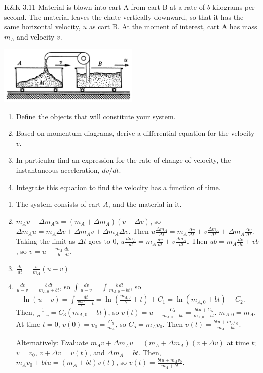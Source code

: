 \documentclass{esg8012pset}
\renewcommand{\d}{\,d}
\begin{document}
\begin{problem}{K\&K 3.11}
  Material is blown into cart A from cart B at a rate of $b$ kilograms per second. The material leaves the chute vertically downward, so that it has the same horizontal velocity, $u$ as cart B. At the moment of interest, cart A has mass $m_A$ and velocity $v$.
  \begin{center}\includegraphics[width=0.5\textwidth]{ps_04_2}\end{center}
  \begin{enumerate}
    \item Define the objects that will constitute your system.
    \item Based on momentum diagrams, derive a differential equation for the velocity $v$.
    \item In particular find an expression for the rate of change of velocity, the instantaneous acceleration, $d v / d t$.
    \item Integrate this equation to find the velocity has a function of time.
  \end{enumerate}
\end{problem}
\begin{solution}
  \begin{enumerate}
    \item The system consists of cart $A$, and the material in it.
    \item $m_A v + \Delta m_A u = (m_A + \Delta m_A) (v + \Delta v)$, so $\Delta m_A u = m_A \Delta v + \Delta m_A v + \Delta m_A \Delta v$.  Then $u \frac{\Delta m_A}{\Delta t} = m_A\frac{\Delta v}{\Delta t} + v\frac{\Delta m_A}{\Delta t} + \Delta m_A \frac{\Delta v}{\Delta t}$.  Taking the limit as $\Delta t$ goes to 0, $u\frac{\d m_A}{\d t} = m_A \frac{\d v}{\d t} + v\frac{\d m_A}{\d t}$.  Then $ub = m_A \frac{\d v}{\d t} + vb$, so $v = u - \frac{m_A}{b}\frac{\d v}{\d t}$.
    \item $\frac{\d v}{\d t} = \frac{b}{m_A}(u - v)$
    \item $\frac{\d v}{u - v} = \frac{b\d t}{m_{A, 0} + bt}$, so $\int \frac{\d v}{u - v} = \int \frac{b\d t}{m_{A, 0} + bt}$, so $-\ln(u - v) = \int\frac{\d t}{\frac{m_{A,0}}{b} + t} = \ln\left(\frac{m_{A,0}}{b} + t\right) + C_1 = \ln(m_{A,0} + b t) + C_2$.  Then, $\frac{1}{u - v} = C_3 (m_{A,0} + bt)$, so $v(t) = u - \frac{C_4}{m_{A,0} + bt} = \frac{b t u + C_5}{m_{A, 0} + b t}$.  $m_{A, 0} = m_A$.  At time $t = 0$, $v(0) = v_0 = \frac{C_5}{m_A}$, so $C_5 = m_A v_0$.  Then $v(t) = \frac{b t u + m_A v_0}{m_A + b t}$. \par
    Alternatively: Evaluate $m_A v + \Delta m_A u = (m_A + \Delta m_A) (v + \Delta v)$ at time $t$; $v = v_0$, $v + \Delta v = v(t)$, and $\Delta m_A = b t$.  Then, $m_A v_0 + b t u = (m_A + b t)v(t)$, so $v(t) = \frac{b t u + m_A v_0}{m_A + b t}$.
  \end{enumerate}
\end{solution}
\end{document}
